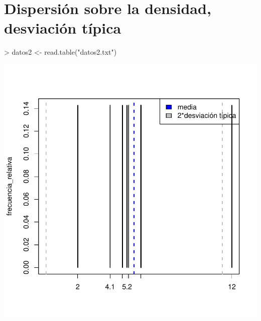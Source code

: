 \documentclass [a4paper] {article}
\begin{document}
\newpage
\section{Dispersión sobre la densidad, desviación típica}

\begin{Schunk}
\begin{Sinput}
> datos2 <- read.table("datos2.txt")
\end{Sinput}
\end{Schunk}

\begin{center}
\begin{Schunk}
\end{Schunk}
\includegraphics{entrega-desviacion_tipica_densidad}
\end{center}
\end{document}
